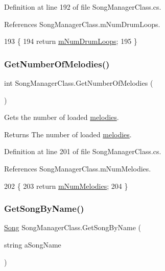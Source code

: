 Definition at line 192 of file Song\+Manager\+Class.\+cs.



References Song\+Manager\+Class.\+m\+Num\+Drum\+Loops.


\begin{DoxyCode}
193     \{
194         \textcolor{keywordflow}{return} \hyperlink{group___s_m_priv_var_ga0ea9b6c8343a9b2cbe0eb375edaef247}{mNumDrumLoops};
195     \}
\end{DoxyCode}
\mbox{\label{group___s_m_pub_func_gae1d2222909f1d9a1f761591c7154f42c}} 
\subsubsection{\texorpdfstring{Get\+Number\+Of\+Melodies()}{GetNumberOfMelodies()}}
{\footnotesize\ttfamily int Song\+Manager\+Class.\+Get\+Number\+Of\+Melodies (\begin{DoxyParamCaption}{ }\end{DoxyParamCaption})}



Gets the number of loaded \hyperlink{group___song_group_DocSongMelody}{melodies}. 

\begin{DoxyReturn}{Returns}
The number of loaded \hyperlink{group___song_group_DocSongMelody}{melodies}. 
\end{DoxyReturn}


Definition at line 201 of file Song\+Manager\+Class.\+cs.



References Song\+Manager\+Class.\+m\+Num\+Melodies.


\begin{DoxyCode}
202     \{
203         \textcolor{keywordflow}{return} \hyperlink{group___s_m_priv_var_ga58ea3b4f794b9e444eece384ae6e8197}{mNumMelodies};
204     \}
\end{DoxyCode}
\mbox{\label{group___s_m_pub_func_gafe818c55bd858c52c95a2fa7a566006a}} 
\subsubsection{\texorpdfstring{Get\+Song\+By\+Name()}{GetSongByName()}}
{\footnotesize\ttfamily \hyperlink{class_song}{Song} Song\+Manager\+Class.\+Get\+Song\+By\+Name (\begin{DoxyParamCaption}\item[{string}]{a\+Song\+Name }\end{DoxyParamCaption})}



